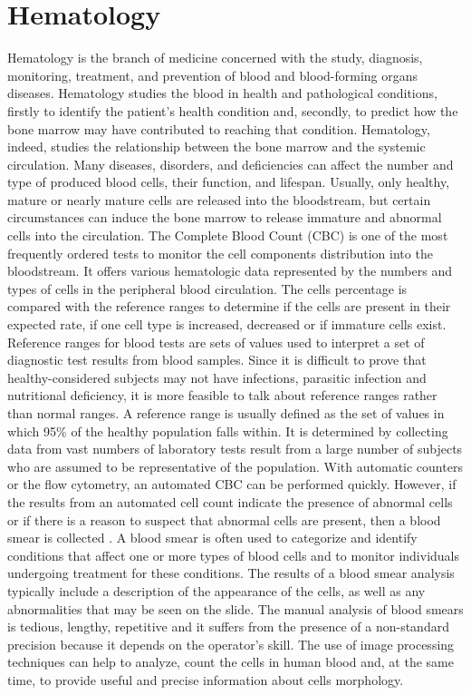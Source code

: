 \documentclass[final,a4paper,12pt,english]{UnicaPhdThesis3}
\begin{document}
\section{Hematology} %
Hematology is the branch of medicine concerned with the study, diagnosis, monitoring, treatment, and prevention of blood and blood-forming organs diseases. Hematology studies the blood in health and pathological conditions, firstly to identify the patient’s health condition and, secondly, to predict how the bone marrow may have contributed to reaching that condition. 
Hematology, indeed, studies the relationship between the bone marrow and the systemic circulation. Many diseases, disorders, and deficiencies can affect the number and type of produced blood cells, their function, and lifespan. Usually, only healthy, mature or nearly mature cells are released into the bloodstream, but certain circumstances can induce the bone marrow to release immature and abnormal cells into the circulation. The Complete Blood Count (CBC) is one of the most frequently ordered tests to monitor the cell components distribution into the bloodstream. It offers various hematologic data represented by the numbers and types of cells in the peripheral blood circulation. The cells percentage is compared with the reference ranges to determine if the cells are present in their expected rate, if one cell type is increased, decreased or if immature cells exist. Reference ranges for blood tests are sets of values used to interpret a set of diagnostic test results from blood samples. Since it is difficult to prove that healthy-considered subjects may not have infections, parasitic infection and nutritional deficiency, it is more feasible to talk about reference ranges rather than normal ranges. A reference range is usually defined as the set of values in which 95\% of the healthy population falls within. It is determined by collecting data from vast numbers of laboratory tests result from a large number of subjects who are assumed to be representative of the population. With automatic counters or the flow cytometry, an automated CBC can be performed quickly. However, if the results from an automated cell count indicate the presence of abnormal cells or if there is a reason to suspect that abnormal cells are present, then a blood smear is collected \cite{Loddo2016}. A blood smear is often used to categorize and identify conditions that affect one or more types of blood cells and to monitor individuals undergoing treatment for these conditions. The results of a blood smear analysis typically include a description of the appearance of the cells, as well as any abnormalities that may be seen on the slide. The manual analysis of blood smears is tedious, lengthy, repetitive and it suffers from the presence of a non-standard precision because it depends on the operator's skill. The use of image processing techniques can help to analyze, count the cells in human blood and, at the same time, to provide useful and precise information about cells morphology.
\end{document}
